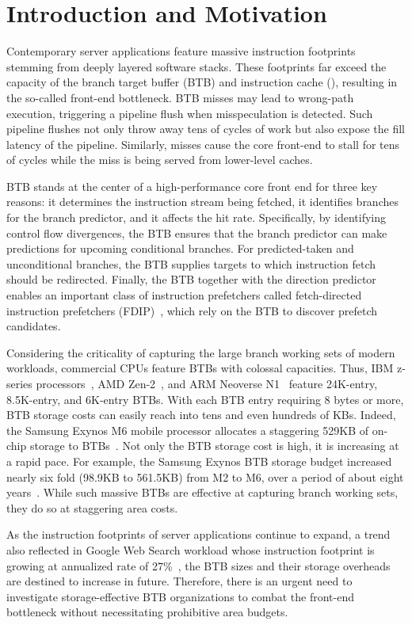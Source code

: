 \section{Introduction and Motivation}
\label{pact:sec::intro}

Contemporary server applications feature massive instruction footprints stemming from deeply layered software stacks. These footprints far exceed the capacity of the branch target buffer (BTB) and instruction cache (), resulting in the so-called front-end bottleneck. BTB misses may lead to wrong-path execution, triggering a pipeline flush when misspeculation is detected. Such pipeline flushes not only throw away tens of cycles of work but also expose the fill latency of the pipeline. Similarly,  misses cause the core front-end to stall for tens of cycles while the miss is being served from lower-level caches. 

BTB stands at the center of a high-performance core front end for three key reasons: it determines the instruction stream being fetched, it identifies branches for the branch predictor, and it affects the  hit rate. Specifically, by identifying control flow divergences, the BTB ensures that the branch predictor can make predictions for upcoming conditional branches. For predicted-taken and unconditional branches, the BTB supplies targets to which instruction fetch should be redirected. Finally, the BTB together with the direction predictor enables an important class of instruction prefetchers called fetch-directed instruction prefetchers (FDIP)~\cite{fdip, boomerang, shotgun}, which rely on the BTB to discover  prefetch candidates. 

Considering the criticality of capturing the large branch working sets of modern workloads, commercial CPUs feature BTBs with colossal capacities. Thus, IBM z-series processors~\cite{IBMz}, AMD Zen-2~\cite{zen2}, and ARM Neoverse N1~\cite{neoverse} feature 24K-entry, 8.5K-entry, and 6K-entry BTBs. With each BTB entry requiring 8 bytes or more, BTB storage costs can easily reach into tens and even hundreds of KBs. Indeed, the Samsung Exynos M6 mobile processor allocates a staggering 529KB of on-chip storage to BTBs~\cite{exynos}. Not only the BTB storage cost is high, it is increasing at a rapid pace. For example, the Samsung Exynos BTB storage budget increased nearly six fold (98.9KB to 561.5KB) from M2 to M6, over a period of about eight years~\cite{exynos}. While such massive BTBs are effective at capturing branch working sets, they do so at staggering area costs.

As the instruction footprints of server applications continue to expand, a trend also reflected in Google Web Search workload whose instruction footprint is growing at annualized rate of 27\%~\cite{profileWarehouse}, the BTB sizes and their storage overheads are destined to increase in future. Therefore, there is an urgent need to investigate storage-effective BTB organizations to combat the front-end bottleneck without necessitating prohibitive area budgets.